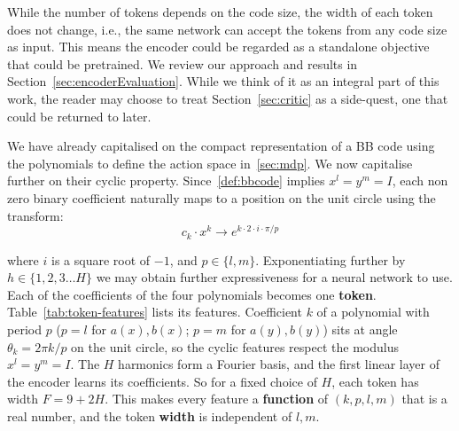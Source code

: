 \noindent While the number of tokens depends on the code size, the width of each token does not change, i.e., the same network can accept the tokens from any
code size as input.
This means the encoder could be regarded as a standalone objective that could be pretrained.
We review our approach and results in Section~\ref{sec:encoderEvaluation}. 
While we think of it as an integral part of this work,
the reader may choose to treat Section~\ref{sec:critic} as a side-quest, one that could be returned to later.
  
  \noindent We have already capitalised on the compact representation of a BB code using the polynomials \polynomials{} to define the action space in~\ref{sec:mdp}.
  We now capitalise further on their cyclic property. Since~\ref{def:bbcode} implies \(x^{l}=y^{m}=I\), 
  each non zero binary coefficient naturally maps to a position on the unit circle using the transform:
  \begin{equation}
   c_{k}\cdot x^{k} \rightarrow e^{k\cdot 2\cdot i \cdot \pi /p}
  \end{equation}    
    
\noindent where \(i\) is a square root of \(-1\), and \(p \in \{l,m\}\).
  Exponentiating further by \(h\in \{1,2,3\ldots H\}\) we may obtain further expressiveness for a neural network
  to use.
  Each of the coefficients of the four polynomials \polynomials{} becomes one
  \textbf{token}.
  Table~\ref{tab:token-features} lists its features. Coefficient \(k\) of a
  polynomial with period \(p\) (\(p=l\) for \(a(x),b(x)\); \(p=m\) for \(a(y),b(y)\)) sits at
  angle \(\theta_k = 2\pi k/p\) on the unit circle, so the cyclic features respect the
  modulus \(x^{l}=y^{m}=I\).
  The \(H\) harmonics form a Fourier basis, and the first linear layer of the encoder learns its coefficients.
  So for a fixed choice of \(H\), each token has width \(F = 9 + 2H\).
  This makes every feature a \textbf{function} of \((k,p,l,m)\) that is a real number, 
  and the token \textbf{width} is independent of \(l,m\).
  
